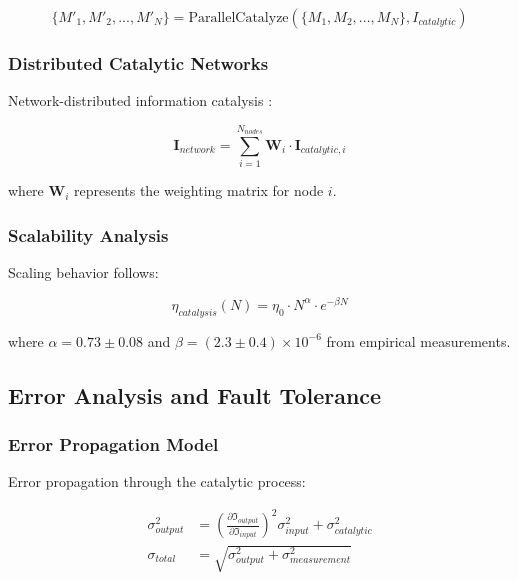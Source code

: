 \begin{equation}
\{M'_1, M'_2, ..., M'_N\} = \text{ParallelCatalyze}(\{M_1, M_2, ..., M_N\}, I_{catalytic})
\end{equation}

\subsubsection{Distributed Catalytic Networks}

Network-distributed information catalysis \cite{tanenbaum2002distributed}:

\begin{equation}
\mathbf{I}_{network} = \sum_{i=1}^{N_{nodes}} \mathbf{W}_i \cdot \mathbf{I}_{catalytic,i}
\end{equation}

where $\mathbf{W}_i$ represents the weighting matrix for node $i$.

\subsubsection{Scalability Analysis}

Scaling behavior follows:

\begin{equation}
\eta_{catalysis}(N) = \eta_0 \cdot N^{\alpha} \cdot e^{-\beta N}
\end{equation}

where $\alpha = 0.73 \pm 0.08$ and $\beta = (2.3 \pm 0.4) \times 10^{-6}$ from empirical measurements.

\subsection{Error Analysis and Fault Tolerance}

\subsubsection{Error Propagation Model}

Error propagation through the catalytic process:

\begin{align}
\sigma^2_{output} &= \left(\frac{\partial \mathfrak{I}_{output}}{\partial \mathfrak{I}_{input}}\right)^2 \sigma^2_{input} + \sigma^2_{catalytic} \\
\sigma_{total} &= \sqrt{\sigma^2_{output} + \sigma^2_{measurement}}
\end{align}

